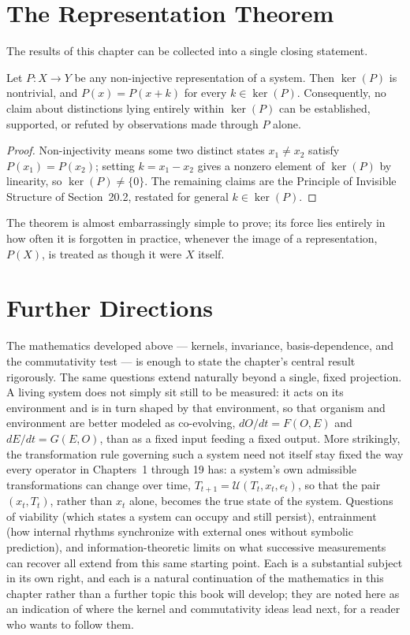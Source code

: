 \section{The Representation Theorem}

The results of this chapter can be collected into a single closing
statement.

\begin{theorem}
Let $P: X \to Y$ be any non-injective representation of a system. Then
$\ker(P)$ is nontrivial, and $P(x) = P(x+k)$ for every $k \in \ker(P)$.
Consequently, no claim about distinctions lying entirely within
$\ker(P)$ can be established, supported, or refuted by observations made
through $P$ alone.
\end{theorem}

\begin{proof}
Non-injectivity means some two distinct states $x_1 \neq x_2$ satisfy
$P(x_1) = P(x_2)$; setting $k = x_1 - x_2$ gives a nonzero element of
$\ker(P)$ by linearity, so $\ker(P) \neq \{0\}$. The remaining claims are
the Principle of Invisible Structure of Section~20.2, restated for
general $k \in \ker(P)$.
\end{proof}

The theorem is almost embarrassingly simple to prove; its force lies
entirely in how often it is forgotten in practice, whenever the image of
a representation, $P(X)$, is treated as though it were $X$ itself.

\section{Further Directions}

The mathematics developed above --- kernels, invariance, basis-dependence,
and the commutativity test --- is enough to state the chapter's central
result rigorously. The same questions extend naturally beyond a single,
fixed projection. A living system does not simply sit still to be
measured: it acts on its environment and is in turn shaped by that
environment, so that organism and environment are better modeled as
co-evolving, $dO/dt = F(O,E)$ and $dE/dt = G(E,O)$, than as a fixed input
feeding a fixed output. More strikingly, the transformation rule
governing such a system need not itself stay fixed the way every operator
in Chapters~1 through 19 has: a system's own admissible transformations
can change over time, $T_{t+1} = \mathcal{U}(T_t, x_t, e_t)$, so that the
pair $(x_t, T_t)$, rather than $x_t$ alone, becomes the true state of the
system. Questions of viability (which states a system can occupy and
still persist), entrainment (how internal rhythms synchronize with
external ones without symbolic prediction), and information-theoretic
limits on what successive measurements can recover all extend from this
same starting point. Each is a substantial subject in its own right, and
each is a natural continuation of the mathematics in this chapter rather
than a further topic this book will develop; they are noted here as an
indication of where the kernel and commutativity ideas lead next, for a
reader who wants to follow them.

